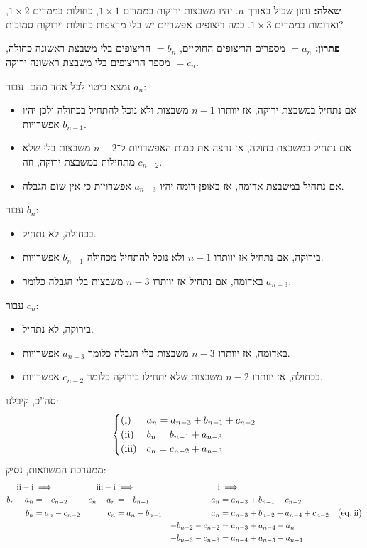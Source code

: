 \documentclass[]{article}
\newcommand{\rn}[1]{
	\textup{\uppercase\expandafter{\romannumeral#1}}
}
\newcommand\open  {\big(}
\newcommand\close {\big)}
\begin{document}
	\section{} %
	\textbf{שאלה: }נתון שביל באורך $n$. יהיו משבצות ירוקות בממדים $1 \times 1$, כחולות בממדים $1 \times 2$, ואדומות בממדים $1 \times 3$. כמה ריצופים אפשריים יש בלי מרצפות כחולות וירוקות סמוכות?
	
	\textbf{פתרון: }$=a_n$ מספרים הריצופים החוקיים, $=b_n$ הריצופים בלי משבצת ראשונה כחולה, $=c_n$ מספר הריצופים בלי משבצת ראשונה ירוקה. 
	
	נמצא ביטוי לכל אחד מהם. עבור $a_n$: 
	\begin{itemize}
		\item אם נתחיל במשבצת ירוקה, אז יוותרו $n - 1$ משבצות ולא נוכל להתחיל בכחולה ולכן יהיו $b_{n - 1}$ אפשרויות. 
		\item אם נתחיל במשבצת כחולה, אז נרצה את כמות האפשרויות ל־$n - 2$ משבצות בלי שלא מתחילות במשבצת ירוקה, וזה $c_{n - 2}$. 
		\item אם נתחיל במשבצת אדומה, אז באופן דומה יהיו $a_{n - 3}$ אפשרויות כי אין שום הגבלה. 
	\end{itemize}
	עבור $b_n$: 
	\begin{itemize}
		\item בכחולה, לא נתחיל. 
		\item בירוקה, אם נתחיל אז יוותרו $n - 1$ ולא נוכל להתחיל מכחולה $b_{n - 1}$ אפשרויות. 
		\item באדומה, אם נתחיל אז יוותרו $n - 3$ משבצות בלי הגבלה כלומר $a_{n - 3}$. 
	\end{itemize}
	עבור $c_n$: 
	\begin{itemize}
		\item בירוקה, לא נתחיל. 
		\item באדומה, אז יוותרו $n - 3$ משבצות בלי הגבלה כלומר $a_{n - 3}$ אפשרויות. 
		\item בכחולה, אז יוותרו $n - 2$ משבצות שלא יתחילו בירוקה כלומר $c_{n - 2}$ אפשרויות. 
	\end{itemize}
	סה''כ, קיבלנו: 
	\[ \begin{cases}
		(\rn{1}) &a_n = a_{n - 3} + b_{n - 1} + c_{n - 2} \\
		(\rn{2}) &b_n = b_{n - 1} + a_{n - 3} \\
		(\rn{3}) &c_n = c_{n - 2} + a_{n - 3}
	\end{cases} \]
	ממערכת המשוואות, נסיק: 
	\begin{align*}
		 \rn{2} - \rn{1} &\implies  &\rn{3} - \rn{1} &\implies   &\rn{1} &\implies \\
		b_n - a_n &= -c_{n - 2}     &c_n - a_n &= -b_{n - 1}     &a_n &= a_{n - 3} + b_{n - 1} + c_{n - 2}  \\
		b_n &= a_n - c_{n - 2}      &c_n &= a_n - b_{n - 1}      &a_n &= a_{n - 3} + b_{n - 2} + a_{n - 4} + c_{n - 2}  \quad \open \mathrm{eq. \; \rn{2}}\close \\
		    &                       &    &                       &-b_{n - 2} - c_{n - 2} &= a_{n - 3} + a_{n - 4} - a_n \\
		    &                       &    &                       &-b_{n - 3} - c_{n - 3} &= a_{n - 4} + a_{n - 5} - a_{n - 1}
	\end{align*}
\end{document}
